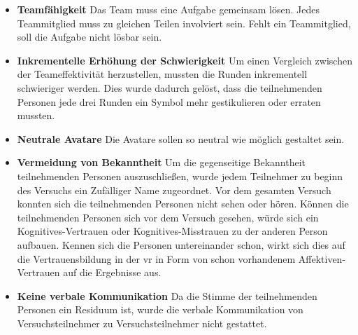 \documentclass[a4paper,11pt]{article}%
\renewcommand{\\}{\vspace*{0.5\baselineskip} \newline}
\begin{document}
\begin{itemize}
\item \textbf{Teamfähigkeit} Das Team muss eine Aufgabe gemeinsam lösen. Jedes Teammitglied muss zu gleichen Teilen involviert sein. Fehlt ein Teammitglied, soll die Aufgabe nicht lösbar sein.
\item \textbf{Inkrementelle Erhöhung der Schwierigkeit} Um einen Vergleich zwischen der Teameffektivität herzustellen, mussten die Runden inkrementell schwieriger werden. Dies wurde dadurch gelöst, dass die teilnehmenden Personen jede drei Runden ein Symbol mehr gestikulieren  oder erraten mussten.
\item \textbf{Neutrale Avatare} Die Avatare sollen so neutral wie möglich gestaltet sein. 
\item \textbf{Vermeidung von Bekanntheit} Um die gegenseitige Bekanntheit  teilnehmenden Personen auszuschließen, wurde jedem Teilnehmer zu beginn des Versuchs ein Zufälliger Name zugeordnet. Vor dem gesamten Versuch konnten sich die teilnehmenden Personen nicht sehen oder hören.
Können die teilnehmenden Personen sich vor dem Versuch gesehen, würde sich ein Kognitives-Vertrauen oder Kognitives-Misstrauen zu der anderen Person aufbauen. 
Kennen sich die Personen untereinander schon, wirkt sich dies auf die Vertrauensbildung in der \ac{vr} in Form von schon vorhandenem Affektiven-Vertrauen auf die Ergebnisse aus.
\item \textbf{Keine verbale Kommunikation} Da die Stimme der teilnehmenden Personen ein Residuum ist, wurde die verbale Kommunikation von Versuchsteilnehmer zu Versuchsteilnehmer nicht gestattet. 
\end{itemize}
\end{document}
